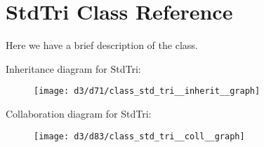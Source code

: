 \hypertarget{class_std_tri}{}\section{Std\+Tri Class Reference}
\label{class_std_tri}


Here we have a brief description of the class.  




Inheritance diagram for Std\+Tri\+:
\nopagebreak
\begin{figure}[H]
\begin{center}
\leavevmode
\texttt{[image: d3/d71/class\_std\_tri\_\_inherit\_\_graph]}
\end{center}
\end{figure}


Collaboration diagram for Std\+Tri\+:
\nopagebreak
\begin{figure}[H]
\begin{center}
\leavevmode
\texttt{[image: d3/d83/class\_std\_tri\_\_coll\_\_graph]}
\end{center}
\end{figure}
